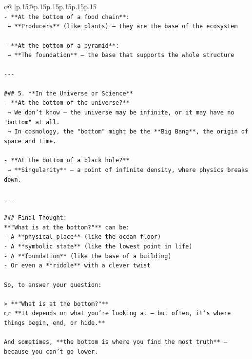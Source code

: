 \documentclass{article}
\begin{document}
{\begin{supertabular}{c@{$\;$}|p{.15\linewidth}@{}p{.15\linewidth}p{.15\linewidth}p{.15\linewidth}p{.15\linewidth}p{.15\linewidth}}
{{{\\ 
\texttt{{-} **At the bottom of a food chain**:  } \\
\texttt{  → **Producers** (like plants) — they are the base of the ecosystem} \\
\\ 
\texttt{{-} **At the bottom of a pyramid**:  } \\
\texttt{  → **The foundation** — the base that supports the whole structure} \\
\\ 
\texttt{{-}{-}{-}} \\
\\ 
\texttt{\#\#\# 5. **In the Universe or Science**} \\
\texttt{{-} **At the bottom of the universe?**  } \\
\texttt{  → We don’t know — the universe may be infinite, or it may have no "bottom" at all.  } \\
\texttt{  → In cosmology, the "bottom" might be the **Big Bang**, the origin of space and time.} \\
\\ 
\texttt{{-} **At the bottom of a black hole?**  } \\
\texttt{  → **Singularity** — a point of infinite density, where physics breaks down.} \\
\\ 
\texttt{{-}{-}{-}} \\
\\ 
\texttt{\#\#\# Final Thought:} \\
\texttt{**"What is at the bottom?"** can be:} \\
\texttt{{-} A **physical place** (like the ocean floor)} \\
\texttt{{-} A **symbolic state** (like the lowest point in life)} \\
\texttt{{-} A **foundation** (like the base of a building)} \\
\texttt{{-} Or even a **riddle** with a clever twist} \\
\\ 
\texttt{So, to answer your question:} \\
\\ 
\texttt{> **"What is at the bottom?"**  } \\
\texttt{👉 **It depends on what you're looking at — but often, it's where things begin, end, or hide.**} \\
\\ 
\texttt{And sometimes, **the bottom is where you find the most truth** — because you can’t go lower.} \\
}}}
\end{supertabular}}
\end{document}
